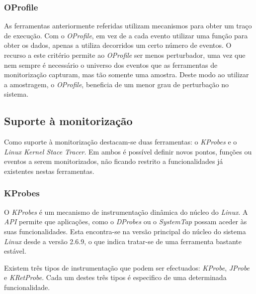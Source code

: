\subsubsection{OProfile}\label{cap:Oprofile_overview}
As ferramentas anteriormente referidas utilizam mecanismos para obter um traço de execução.
Com o \textit{OProfile}, em vez de a cada evento utilizar uma função para obter os dados, apenas a utiliza decorridos um certo número de eventos.
O recurso a este critério permite ao \textit{OProfile} ser menos perturbador, uma vez que nem sempre é necessário o universo dos eventos que as ferramentas de monitorização capturam, mas tão somente uma amostra.
Deste modo ao utilizar a amostragem, o \textit{OProfile}, beneficia de um menor grau de perturbação no sistema\cite{Will:TuninProgrOProf}.


\subsection{Suporte à monitorização}

Como suporte à monitorização destacam-se duas ferramentas: o \textit{KProbes} e o \textit{Linux Kernel Stace Tracer}.
Em ambos é possível definir novos pontos, funções ou eventos a serem monitorizados, não ficando restrito a funcionalidades já existentes nestas ferramentas.

\subsubsection{KProbes}\label{sect:KProbes_overview}

O \textit{KProbes} é um mecanismo de instrumentação dinâmica do núcleo do \textit{Linux}.
A \textit{API} permite que aplicações, como o \textit{DProbes} ou o \textit{SystemTap} possam aceder às suas funcionalidades.
Esta encontra-se na versão principal do núcleo do sistema \textit{Linux} desde a versão 2.6.9, o que indica tratar-se de uma ferramenta bastante estável\cite{kernel_debug_printk_on_fly,KProbesSite}.

Existem três tipos de instrumentação que podem ser efectuados: \textit{KProbe}, \textit{JProbe} e \textit{KRetProbe}.
Cada um destes três tipos é especifico de uma determinada funcionalidade.

